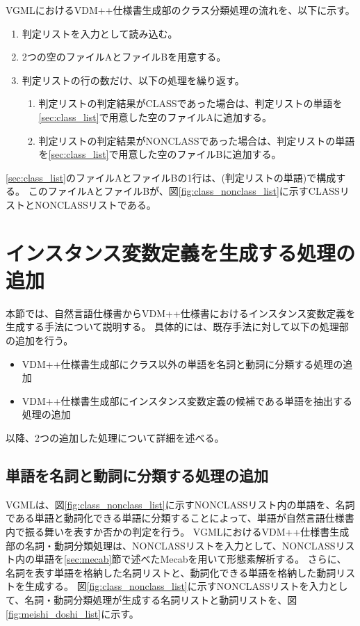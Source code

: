 VGMLにおけるVDM++仕様書生成部のクラス分類処理の流れを、以下に示す。

\begin{enumerate}
    \item 判定リストを入力として読み込む。
    \item 2つの空のファイルAとファイルBを用意する。
    \label{sec:class_list}
    \item 判定リストの行の数だけ、以下の処理を繰り返す。
        \begin{enumerate}
            \item 判定リストの判定結果がCLASSであった場合は、判定リストの単語を\ref{sec:class_list}で用意した空のファイルAに追加する。
            \item 判定リストの判定結果がNONCLASSであった場合は、判定リストの単語を\ref{sec:class_list}で用意した空のファイルBに追加する。
        \end{enumerate}
\end{enumerate}

\ref{sec:class_list}のファイルAとファイルBの1行は、(判定リストの単語)で構成する。
このファイルAとファイルBが、図\ref{fig:class_nonclass_list}に示すCLASSリストとNONCLASSリストである。

\section{インスタンス変数定義を生成する処理の追加}
\label{sec:instance_generate}
本節では、自然言語仕様書からVDM++仕様書におけるインスタンス変数定義を生成する手法について説明する。
具体的には、既存手法に対して以下の処理部の追加を行う。

\begin{itemize}
    \item VDM++仕様書生成部にクラス以外の単語を名詞と動詞に分類する処理の追加
    \item VDM++仕様書生成部にインスタンス変数定義の候補である単語を抽出する処理の追加
\end{itemize}

以降、2つの追加した処理について詳細を述べる。

\subsection{単語を名詞と動詞に分類する処理の追加}
\label{sec:classifier_meishi}
VGMLは、図\ref{fig:class_nonclass_list}に示すNONCLASSリスト内の単語を、名詞である単語と動詞化できる単語に分類することによって、単語が自然言語仕様書内で振る舞いを表すか否かの判定を行う。
VGMLにおけるVDM++仕様書生成部の名詞・動詞分類処理は、NONCLASSリストを入力として、NONCLASSリスト内の単語を\ref{sec:mecab}節で述べたMecabを用いて形態素解析する。
さらに、名詞を表す単語を格納した名詞リストと、動詞化できる単語を格納した動詞リストを生成する。
図\ref{fig:class_nonclass_list}に示すNONCLASSリストを入力として、名詞・動詞分類処理が生成する名詞リストと動詞リストを、図\ref{fig:meishi_doshi_list}に示す。


